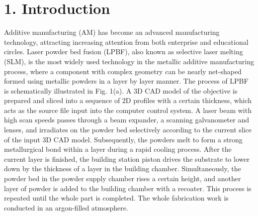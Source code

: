 \documentclass[10pt]{article}
\begin{document}
\section*{1. Introduction}
Additive manufacturing (AM) has become an advanced manufacturing technology, attracting increasing attention from both enterprise and educational circles. Laser powder bed fusion (LPBF), also known as selective laser melting (SLM), is the most widely used technology in the metallic additive manufacturing process, where a component with complex geometry can be nearly net-shaped formed using metallic powders in a layer by layer manner. The process of LPBF is schematically illustrated in Fig. 1(a). A 3D CAD model of the objective is prepared and sliced into a sequence of $2 \mathrm{D}$ profiles with a certain thickness, which acts as the source file input into the computer control system. A laser beam with high scan speeds passes through a beam expander, a scanning galvanometer and lenses, and irradiates on the powder bed selectively according to the current slice of the input 3D CAD model. Subsequently, the powders melt to form a strong metallurgical bond within a layer during a rapid cooling process. After the current layer is finished, the building station piston drives the substrate to lower down by the thickness of a layer in the building chamber. Simultaneously, the powder bed in the powder supply chamber rises a certain height, and another layer of powder is added to the building chamber with a recoater. This process is repeated until the whole part is completed. The whole fabrication work is conducted in an argon-filled atmosphere.
\end{document}

